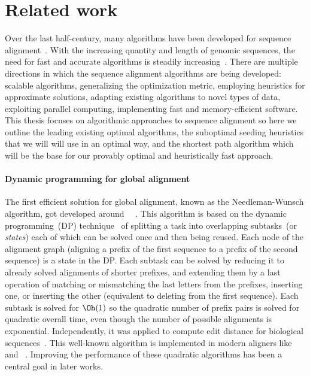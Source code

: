 \section*{Related work}

Over the last half-century, many algorithms have been developed for sequence
alignment~\citep{navarro2001guided}. With the increasing quantity and length of
genomic sequences, the need for fast and accurate algorithms is steadily
increasing~\cite{alser2021technology}. There are multiple directions in which
the sequence alignment algorithms are being developed: scalable algorithms,
generalizing the optimization metric, employing heuristics for approximate
solutions, adapting existing algorithms to novel types of data, exploiting
parallel computing, implementing fast and memory-efficient software. This thesis
focuses on algorithmic approaches to sequence alignment so here we outline the
leading existing optimal algorithms, the suboptimal seeding heuristics that we
will will use in an optimal way, and the \A shortest path algorithm which will
be the base for our provably optimal and heuristically fast approach.

\paragraph{Dynamic programming for global alignment}
The first efficient solution for global alignment, known as the Needleman-Wunsch
algorithm, got developed around~\citeyear{vintsyuk1968speech}~
\cite{vintsyuk1968speech,needleman1970general}. This algorithm is based on the
dynamic programming~(DP) technique~\cite{bellman1954theory} of splitting a task
into overlapping subtasks~(or \emph{states}) each of which can be solved once
and then being reused. Each node of the alignment graph (aligning a prefix of
the first sequence to a prefix of the second sequence) is a state in the DP.
Each subtask can be solved by reducing it to already solved alignments of
shorter prefixes, and extending them by a last operation of matching or
mismatching the last letters from the prefixes, inserting one, or inserting the
other (equivalent to deleting from the first sequence). Each subtask is solved
for $\Oh(1)$ so the quadratic number of prefix pairs is solved for quadratic
overall time, even though the number of possible alignments is exponential.
Independently, it was applied to compute edit distance for biological
sequences~\citep{needleman1970general,sankoff1972matching,sellers1974theory,wagner1974string}.
This well-known algorithm is implemented in modern aligners  like
\seqan~\citep{reinert2017seqan} and \parasail~\citep{daily2016parasail}.
Improving the performance of these quadratic algorithms has been a central goal
in later works.

